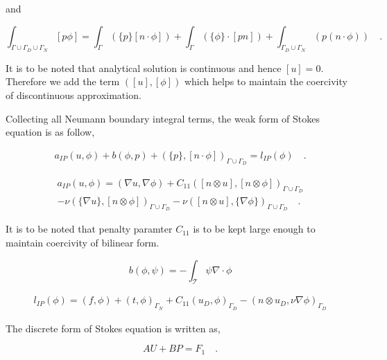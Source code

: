 \documentclass[a4paper,openany]{book}
\begin{document}
and 

\begin{equation}
\int_{\Gamma \cup \Gamma_D \cup \Gamma_N} [p \phi] = \int_{\Gamma} (\lbrace p \rbrace [ n \cdot \phi]) + \int_{\Gamma} (\lbrace \phi \rbrace \cdot [pn]) + \int_{\Gamma_D \cup \Gamma_N} (p (n \cdot \phi) ) \quad \textrm{.}
\end{equation}

It is to be noted that analytical solution is continuous and hence $[u] = 0$. Therefore we add the term $([u],[\phi])$ which helps to maintain the coercivity of discontinuous approximation.


Collecting all Neumann boundary integral terms, the weak form of Stokes equation is as follow,

\begin{equation}\label{stokes_weak_ch3}
\begin{split}
a_{IP}(u,\phi) + b(\phi,p) + (\{p\},[n\cdot \phi])_{\Gamma \cup \Gamma_D} = l_{IP}(\phi) \quad \textrm{.}
\end{split}
\end{equation}

\begin{equation}
\begin{split}
a_{IP}(u,\phi) = (\nabla u, \nabla \phi) + C_{11} ([n \otimes u],[n \otimes \phi])_{\Gamma \cup \Gamma_D} \\
- \nu (\{\nabla u\},[n \otimes \phi])_{\Gamma \cup \Gamma_D} - \nu ([n \otimes u],\{\nabla \phi\})_{\Gamma \cup \Gamma_D} \quad \textrm{.}
\end{split}
\end{equation}

It is to be noted that penalty paramter $C_{11}$ is to be kept large enough to maintain coercivity of bilinear form.

\begin{equation}
b(\phi,\psi) = -\int_{\mathcal{T}} \psi \nabla \cdot \phi
\end{equation}

\begin{equation}
\begin{split}
l_{IP}(\phi) = (f,\phi) + (t,\phi)_{\Gamma_N} + C_{11} (u_D,\phi)_{\Gamma_D} - (n \otimes u_D, \nu \nabla \phi)_{\Gamma_D}
\end{split}
\end{equation}

The discrete form of Stokes equation is written as,

\begin{equation} \label{stokes discrete_ch3}
AU + BP = F_1 \quad \textrm{.}
\end{equation}
\end{document}
